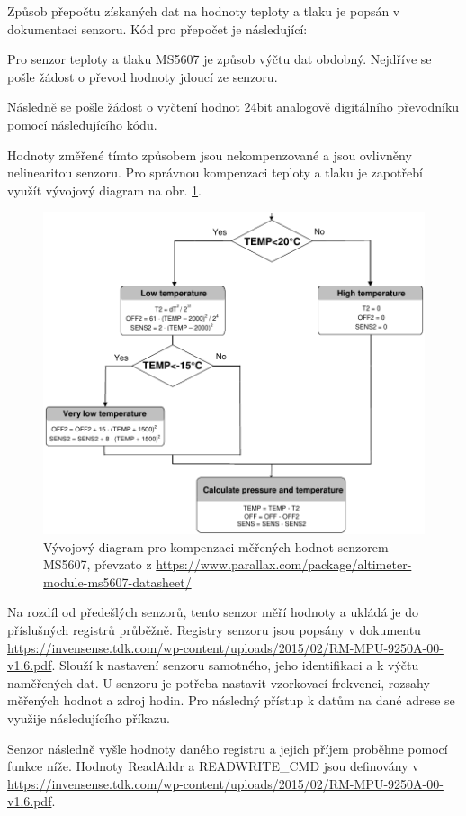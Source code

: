 \documentclass[twoside]{ctuthesis}
\theoremstyle{plain}
\theoremstyle{definition}
\theoremstyle{note}
\begin{document}
	Způsob přepočtu získaných dat na hodnoty teploty a tlaku je popsán v dokumentaci senzoru. Kód pro přepočet je následující:
	

	Pro senzor teploty a tlaku MS5607 je způsob výčtu dat obdobný. Nejdříve se pošle žádost o převod hodnoty jdoucí ze senzoru.
	
	Následně se pošle žádost o vyčtení hodnot 24bit analogově digitálního převodníku pomocí následujícího kódu.
	

	Hodnoty změřené tímto způsobem jsou nekompenzované a jsou ovlivněny nelinearitou senzoru. Pro správnou kompenzaci teploty a tlaku je zapotřebí využít vývojový diagram na obr. \ref{fig:ms5607:flowchart}.
	\begin{figure}
		\centering
		\includegraphics[width=.7\textwidth]{Figures/MS5607_flowchart.pdf}
		\caption{Vývojový diagram pro kompenzaci měřených hodnot senzorem MS5607, převzato z \url{https://www.parallax.com/package/altimeter-module-ms5607-datasheet/}}
		\label{fig:ms5607:flowchart}
	\end{figure}

	Na rozdíl od předešlých senzorů, tento senzor měří hodnoty a ukládá je do příslušných registrů průběžně. Registry senzoru jsou popsány v dokumentu \url{https://invensense.tdk.com/wp-content/uploads/2015/02/RM-MPU-9250A-00-v1.6.pdf}. Slouží k nastavení senzoru samotného, jeho identifikaci a k výčtu naměřených dat. U senzoru je potřeba nastavit vzorkovací frekvenci, rozsahy měřených hodnot a zdroj hodin. Pro následný přístup k datům na dané adrese se využije následujícího příkazu.
	
	Senzor následně vyšle hodnoty daného registru a jejich příjem proběhne pomocí funkce níže. Hodnoty ReadAddr a READWRITE\_CMD jsou definovány v \url{https://invensense.tdk.com/wp-content/uploads/2015/02/RM-MPU-9250A-00-v1.6.pdf}.
	
	
\end{document}
